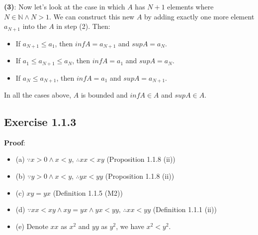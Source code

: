 \documentclass[12pt, letterpaper, oneside]{book}
\begin{document}
\textbf{(3)}: Now let's look at the case in which $A$ has $N+1$ elements where $N \in \mathbb{N} \land N > 1$. We can
construct this new $A$ by adding exactly one more element $a_{N+1}$ into the $A$ in step (2). Then:
\begin{itemize}
  \item If $a_{N+1} \le a_1$, then $inf A = a_{N+1}$ and $sup A = a_N$.
  \item If $a_1 \le a_{N+1} \le a_N$, then $inf A = a_1$ and $sup A = a_N$.
  \item If $a_N \le a_{N+1}$, then $inf A = a_1$ and $sup A = a_{N+1}$.
\end{itemize}

In all the cases above, $A$ is bounded and $inf A \in A$ and $sup A \in A$.

\subsection{Exercise 1.1.3}

\textbf{Proof}:
\begin{itemize}
  \item (a) $\because x > 0 \land x < y$, $\therefore xx < xy$ (Proposition 1.1.8 (ii))
  \item (b) $\because y > 0 \land x < y$, $\therefore yx < yy$ (Proposition 1.1.8 (ii))
  \item (c) $xy = yx$ (Definition 1.1.5 (M2))
  \item (d) $\because xx < xy \land xy = yx \land yx < yy$, $\therefore xx < yy$ (Definition 1.1.1 (ii))
  \item (e) Denote $xx$ as $x^2$ and $yy$ as $y^2$, we have $x^2 < y^2$.
\end{itemize}
\end{document}
